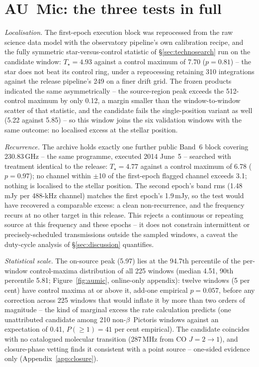\documentclass{openjournal}
\begin{document}
\section{AU~Mic: the three tests in full}
\label{app:aumic}

\emph{Localisation.} The first-epoch execution block was reprocessed
from the raw science data model with the observatory pipeline's own
calibration recipe, and the fully symmetric star-versus-control
statistic of \S\ref{sec:technosearch} run on the candidate window:
$T_\star=4.93$ against a control maximum of 7.70 ($p=0.81$) -- the
star does not beat its control ring, under a reprocessing retaining
310 integrations against the release pipeline's 249 on a finer drift
grid. The frozen products indicated the same asymmetrically -- the
source-region peak exceeds the 512-control maximum by only 0.12, a
margin smaller than the window-to-window scatter of that statistic,
and the candidate fails the single-position variant as well (5.22
against 5.85) -- so this window joins the six validation windows with
the same outcome: no localised excess at the stellar position.

\emph{Recurrence.} The archive holds exactly one further public
Band~6 block covering 230.83\,GHz -- the same programme, executed
2014 June~5 -- searched with treatment identical to the release:
$T_\star=4.77$ against a control maximum of 6.78 ($p=0.97$); no
channel within $\pm$10 of the first-epoch flagged channel exceeds
3.1; nothing is localised to the stellar position. The second epoch's
band rms (1.48\,mJy per 488-kHz channel) matches the first epoch's
1.9\,mJy, so the test would have recovered a comparable excess: a
clean non-recurrence, and the frequency recurs at no other target in
this release. This rejects a continuous or repeating source at this
frequency and these epochs -- it does not constrain intermittent or
precisely-scheduled transmissions outside the sampled windows, a
caveat the duty-cycle analysis of \S\ref{sec:discussion} quantifies.

\emph{Statistical scale.} The on-source peak (5.97) lies at the
94.7th percentile of the per-window control-maxima distribution of
all 225 windows (median 4.51, 90th percentile 5.81;
Figure~\ref{fig:aumic}, online-only appendix): twelve windows (5 per
cent) have control maxima at or above it, add-one empirical
$p=0.057$, before any correction across 225 windows that would
inflate it by more than two orders of magnitude -- the kind of
marginal excess the rate calculation predicts (one unattributed
candidate among 210 non-$\beta$~Pictoris windows against an
expectation of 0.41, $P(\geq1)=41$ per cent empirical). The candidate
coincides with no catalogued molecular transition
(287\,MHz from CO $J{=}2{\to}1$), and closure-phase vetting finds it
consistent with a point source -- one-sided evidence only
(Appendix~\ref{app:closure}).
\end{document}
